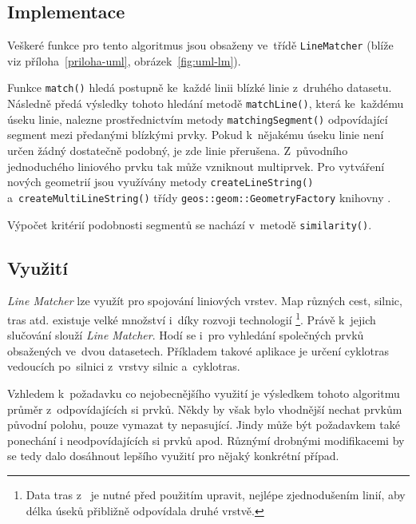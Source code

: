 \subsection{Implementace}
\label{lm-implementace}

Veškeré funkce pro tento algoritmus jsou obsaženy ve~třídě \texttt{Line\-Matcher}
(blíže viz příloha~\ref{priloha-uml}, obrázek~\ref{fig:uml-lm}).

Funkce \texttt{match()} hledá postupně ke~každé linii blízké linie z~druhého datasetu.
Následně předá výsledky tohoto hledání metodě \texttt{match\-Line()}, která ke~každému
úseku linie, nalezne prostřednictvím metody \texttt{matching\-Segment()} odpovídající
segment mezi předanými blízkými prvky. Pokud k~nějakému úseku linie není určen
žádný dostatečně podobný, je zde linie přerušena. Z~původního jednoduchého liniového
prvku tak může vzniknout multiprvek. Pro vytváření nových geometrií jsou využívány
metody \texttt{createLineString()} a~\texttt{createMultiLineString()} třídy 
\texttt{geos::geom::GeometryFactory} knihovny .
 
Výpočet kritérií podobnosti segmentů se nachází v~metodě \texttt{similarity()}. 

\subsection{Využití}
\label{lm-vyuziti}

\textit{Line Matcher} lze využít pro spojování liniových vrstev. Map různých cest, 
silnic, tras atd. existuje velké množství i~díky rozvoji technologií 
\footnote{Data tras z~ je nutné před použitím upravit, nejlépe 
zjednodušením linií, aby délka úseků přibližně odpovídala druhé vrstvě.}. Právě
k~jejich slučování slouží \textit{Line Matcher}. Hodí se i~pro vyhledání 
společných prvků obsažených ve~dvou datasetech. Příkladem takové aplikace je 
určení cyklotras vedoucích po~silnici z~vrstvy silnic a~cyklotras.

Vzhledem k~požadavku co nejobecnějšího využití je výsledkem tohoto algoritmu
průměr z~odpovídajících si prvků.  Někdy by však bylo vhodnější nechat prvkům
původní polohu, pouze vymazat ty nepasující. Jindy může být požadavkem také
ponechání i neodpovídajících si prvků apod. Různýmí drobnými modifikacemi
by se tedy dalo dosáhnout lepšího využití pro nějaký konkrétní případ.
